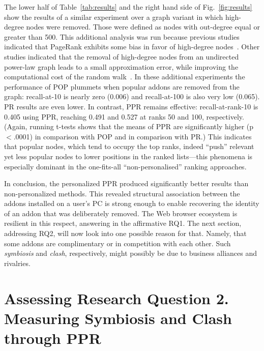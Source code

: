\documentclass[10pt,letterpaper]{article}
\begin{document}
The lower half of Table~\ref{tab:results} and the right hand side of Fig.~\ref{fig:results} show the results of a similar experiment over a graph variant in which high-degree nodes were removed. Those were defined as nodes with out-degree equal or greater than 500. This additional analysis was run because previous studies indicated that PageRank exhibits some bias in favor of high-degree nodes~\cite{tong2006center,budalakoti2012}. Other studies indicated that the removal of high-degree nodes from an undirected power-law graph leads to a small approximation error, while improving the computational cost of the random walk~\cite{sarkar2010tractable}. In these additional experiments the performance of POP plummets when popular addons are removed from the graph: recall-at-10 is nearly zero (0.006) and recall-at-100 is also very low (0.065). PR results are even lower. In contrast, PPR remains effective: recall-at-rank-10 is 0.405 using PPR, reaching 0.491 and 0.527 at ranks 50 and 100, respectively. (Again, running t-tests shows that the means of PPR are significantly higher (p$<$.0001) in comparison with POP and in comparison with PR.) This indicates that popular nodes, which tend to occupy the top ranks, indeed ``push'' relevant yet less popular nodes to lower positions in the ranked lists---this phenomena is especially dominant in the one-fits-all ``non-personalised'' ranking approaches.

In conclusion, the personalized PPR produced significantly better results than non-personalized methods. This revealed structural association between the addons installed on a user's PC is strong enough to enable recovering the identity of an addon that was deliberately removed. The Web browser ecosystem is resilient in this respect, answering in the affirmative RQ1. The next section, addressing RQ2, will now look into one possible reason for that. Namely, that some addons are complimentary or in competition with each other. Such \textit{symbiosis} and \textit{clash}, respectively, might possibly be due to business alliances and rivalries.

\section*{Assessing Research Question 2. Measuring Symbiosis and Clash through PPR}
\end{document}
